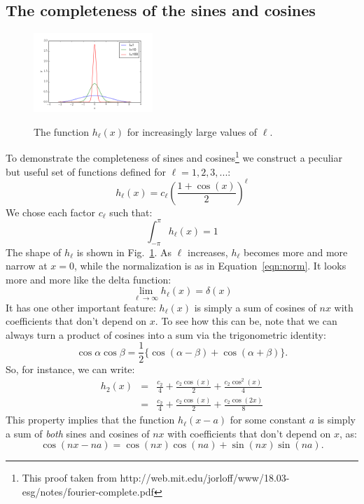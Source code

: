 \documentclass[12pt]{book}
\begin{document}
\subsection{The completeness of the sines and cosines}

\begin{figure}[thb]
\begin{center}
{\includegraphics[width=0.40\textwidth]{figs/hk.png}}
\end{center}
\caption{\label{fig:hl} The function $h_\ell(x)$ for increasingly large values of $\ell$.}
\end{figure}

\noindent
To demonstrate the completeness of sines and cosines\footnote{This proof taken from http://web.mit.edu/jorloff/www/18.03-esg/notes/fourier-complete.pdf} we construct a peculiar but useful set of functions defined for $\ell=1,2,3,...$:
\begin{displaymath}
h_\ell(x) = c_\ell \left(\frac{1 + \cos(x)}{2}\right)^\ell
\end{displaymath}
We chose each factor $c_\ell$ such that:
\begin{displaymath}
\int_{-\pi}^{\pi} h_\ell(x) = 1
\end{displaymath}
The shape of $h_\ell$ is shown in Fig.~\ref{fig:hl}.  As $\ell$ increases, $h_\ell$ becomes more and more narrow at $x=0$, while the normalization is as in Equation~\ref{eqn:norm}.  It looks more and more like the delta function:
\begin{displaymath}
\lim_{\ell \to \infty} h_\ell(x) = \delta(x)
\end{displaymath}
It has one other important feature:  $h_\ell(x)$ is simply a sum of cosines of $nx$ with coefficients that don't depend on $x$.  To see how this can be, note that we can always turn a product of cosines into a sum via the trigonometric identity:
\begin{displaymath}
\cos \alpha \cos \beta = \frac{1}{2} \{\cos(\alpha - \beta) + \cos(\alpha + \beta)\}.
\end{displaymath}
So, for instance, we can write:
\begin{eqnarray*}
h_2(x) &=& \frac{c_2}{4} + \frac{c_2\cos(x)}{2}+\frac{c_2\cos^2(x)}{4} \\
           &=& \frac{c_2}{4} + \frac{c_2\cos(x)}{2}+\frac{c_2\cos(2x)}{8}
\end{eqnarray*}
This property implies that the function $h_\ell(x-a)$ for some constant $a$ is simply a sum of {\em both} sines and cosines of $nx$ with coefficients that don't depend on $x$, as:
\begin{displaymath}
\cos(nx-na) = \cos(nx)\cos(na) + \sin(nx)\sin(na).
\end{displaymath}
\end{document}
